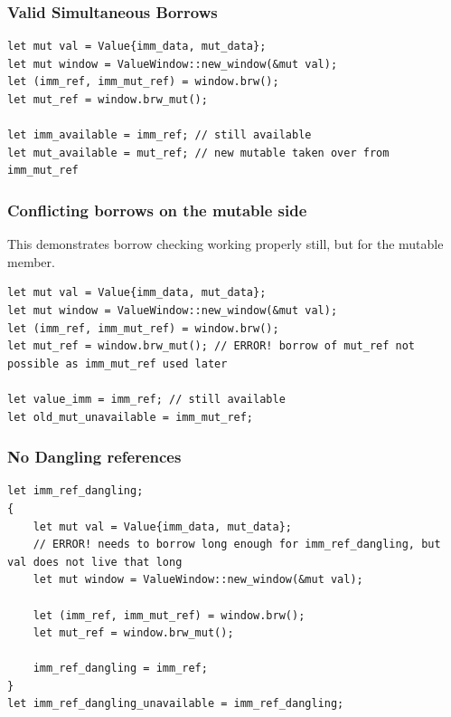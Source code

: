 \subsubsection{Valid Simultaneous Borrows}
\begin{verbatim}
let mut val = Value{imm_data, mut_data};
let mut window = ValueWindow::new_window(&mut val);
let (imm_ref, imm_mut_ref) = window.brw();
let mut_ref = window.brw_mut();

let imm_available = imm_ref; // still available
let mut_available = mut_ref; // new mutable taken over from imm_mut_ref
\end{verbatim}

\subsubsection{Conflicting borrows on the mutable side}
This demonstrates borrow checking working properly still, but for the mutable member.
\begin{verbatim}
let mut val = Value{imm_data, mut_data};
let mut window = ValueWindow::new_window(&mut val);
let (imm_ref, imm_mut_ref) = window.brw();
let mut_ref = window.brw_mut(); // ERROR! borrow of mut_ref not possible as imm_mut_ref used later

let value_imm = imm_ref; // still available
let old_mut_unavailable = imm_mut_ref;  
\end{verbatim}

\subsubsection{No Dangling references}
\begin{verbatim}
let imm_ref_dangling;
{
    let mut val = Value{imm_data, mut_data};
    // ERROR! needs to borrow long enough for imm_ref_dangling, but val does not live that long
    let mut window = ValueWindow::new_window(&mut val);
    
    let (imm_ref, imm_mut_ref) = window.brw();
    let mut_ref = window.brw_mut();
    
    imm_ref_dangling = imm_ref;
}
let imm_ref_dangling_unavailable = imm_ref_dangling;
\end{verbatim}
\begin{center}
    \begin{tabular}{l l l l}
    \end{tabular}
\end{center}

